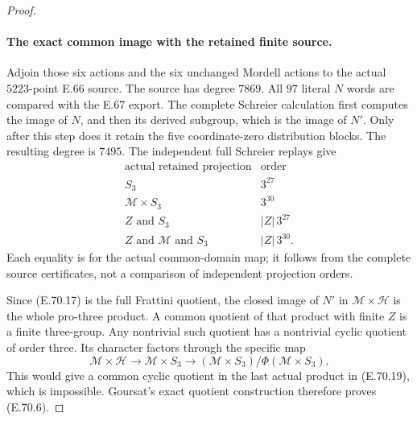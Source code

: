\begin{proof}
\paragraph{The exact common image with the retained finite source.}
Adjoin those six actions and the six unchanged
Mordell actions to the actual $5223$-point E.66
source. The source has degree $7869$. All $97$
literal $N$ words are compared with the E.67
export. The complete Schreier calculation first
computes the image of $N$, and then its derived
subgroup, which is the image of $N'$. Only after
this step does it retain the five coordinate-zero
distribution blocks. The resulting degree is
$7495$. The independent full Schreier replays give
\[
 \begin{array}{c|c}
 \text{actual retained projection}&\text{order}\\ \hline
 S_3&3^{27}\\
 \mathcal M\times S_3&3^{30}\\
 Z\text{ and }S_3&|Z|\,3^{27}\\
 Z\text{ and }\mathcal M\text{ and }S_3&|Z|\,3^{30}.
 \end{array}
 \tag{E.70.19}
\]
Each equality is for the actual common-domain map;
it follows from the complete source certificates,
not a comparison of independent projection orders.

Since (E.70.17) is the full Frattini quotient,
the closed image of $N'$ in $\mathcal M\times\mathscr H$
is the whole pro-three product. A common quotient
of that product with finite $Z$ is a finite
three-group. Any nontrivial such quotient has a
nontrivial cyclic quotient of order three. Its
character factors through the specific map
\[
 \mathcal M\times\mathscr H
       \longrightarrow\mathcal M\times S_3
       \longrightarrow
          (\mathcal M\times S_3)/\Phi(\mathcal M\times S_3).
 \tag{E.70.20}
\]
This would give a common cyclic quotient in the
last actual product in (E.70.19), which is
impossible. Goursat's exact quotient construction
therefore proves (E.70.6).


\end{proof}

